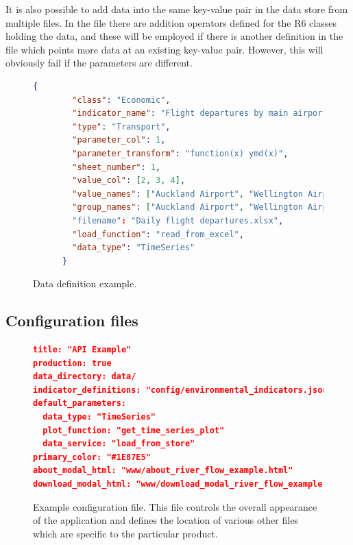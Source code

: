 \documentclass[12pt]{article}
\begin{document}
It is also possible to add data into the same key-value pair in the data store from multiple files.  In the  file there are addition operators defined for the R6 classes holding the data, and these will be employed if there is another definition in the  file which points more data at an existing key-value pair.  However, this will obviously fail if the  parameters are different.


\begin{figure}
\footnotesize
\begin{lstlisting}[language=json,firstnumber=1]
      {
        "class": "Economic",
        "indicator_name": "Flight departures by main airports",
        "type": "Transport",
        "parameter_col": 1,
        "parameter_transform": "function(x) ymd(x)",
        "sheet_number": 1,
        "value_col": [2, 3, 4],
        "value_names": ["Auckland Airport", "Wellington Airport"],
        "group_names": ["Auckland Airport", "Wellington Airport"]
        "filename": "Daily flight departures.xlsx",
        "load_function": "read_from_excel",
        "data_type": "TimeSeries"
      }
\end{lstlisting}
\caption{Data definition example.}\label{fig:data_definition}
\end{figure}


\subsection*{Configuration files}


\begin{figure}
\footnotesize
\begin{lstlisting}[language=json,firstnumber=1]
title: "API Example"
production: true
data_directory: data/
indicator_definitions: "config/environmental_indicators.json"
default_parameters:
  data_type: "TimeSeries"
  plot_function: "get_time_series_plot"
  data_service: "load_from_store"
primary_color: "#1E87E5"
about_modal_html: "www/about_river_flow_example.html"
download_modal_html: "www/download_modal_river_flow_example.html"
\end{lstlisting}
\caption{Example configuration file.  This file controls the overall appearance of the application and defines the location of various other files which are specific to the particular product.}\label{fig:indicator_definition}
\end{figure}


\clearpage%
\thispagestyle{empty}
\end{document}
